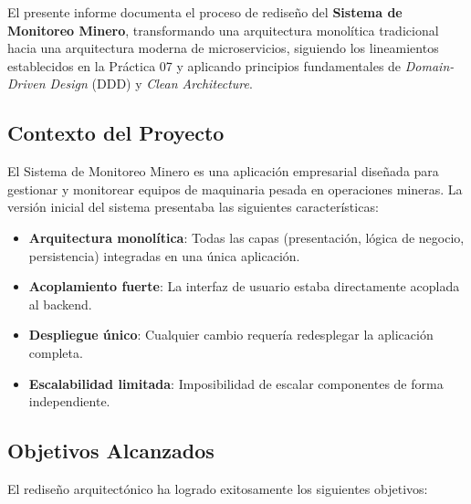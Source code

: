 \documentclass[12pt,a4paper]{article}
\begin{document}
El presente informe documenta el proceso de rediseño del \textbf{Sistema de Monitoreo Minero}, transformando una arquitectura monolítica tradicional hacia una arquitectura moderna de microservicios, siguiendo los lineamientos establecidos en la Práctica 07 y aplicando principios fundamentales de \textit{Domain-Driven Design} (DDD) y \textit{Clean Architecture}.

\subsection{Contexto del Proyecto}

El Sistema de Monitoreo Minero es una aplicación empresarial diseñada para gestionar y monitorear equipos de maquinaria pesada en operaciones mineras. La versión inicial del sistema presentaba las siguientes características:

\begin{itemize}[leftmargin=*]
    \item \textbf{Arquitectura monolítica}: Todas las capas (presentación, lógica de negocio, persistencia) integradas en una única aplicación.
    \item \textbf{Acoplamiento fuerte}: La interfaz de usuario estaba directamente acoplada al backend.
    \item \textbf{Despliegue único}: Cualquier cambio requería redesplegar la aplicación completa.
    \item \textbf{Escalabilidad limitada}: Imposibilidad de escalar componentes de forma independiente.
\end{itemize}

\subsection{Objetivos Alcanzados}

El rediseño arquitectónico ha logrado exitosamente los siguientes objetivos:
\end{document}
